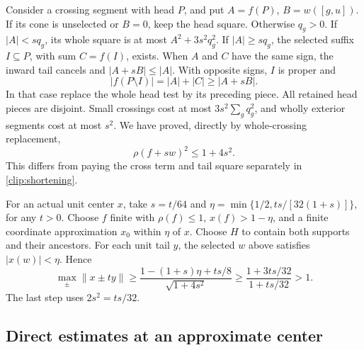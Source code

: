 Consider a crossing segment with head \(P\), and put
\(A=f(P)\), \(B=w([g,u])\). If its cone is unselected or \(B=0\),
keep the head square. Otherwise \(q_g>0\). If \(|A|<s q_g\), its whole
square is at most \(A^2+3s^2q_g^2\). If \(|A|\ge s q_g\), the selected
suffix \(I\subseteq P\), with sum \(C=f(I)\), exists. When \(A\) and
\(C\) have the same sign, the inward tail cancels and
\(|A+sB|\le|A|\). With opposite signs, \(I\) is proper and
\[
 |f(P\setminus I)|=|A|+|C|\ge|A+sB|.
\]
In that case replace the whole head test by its preceding piece.
All retained head pieces are disjoint. Small crossings cost at most
\(3s^2\sum_gq_g^2\), and wholly exterior segments cost at most \(s^2\).
We have proved, directly by whole-crossing replacement,
\begin{equation}\label{dir:primal:add:four-cost}
 \rho(f+sw)^2\le1+4s^2.
\end{equation}
This differs from paying the cross term and tail square separately in
\eqref{clip:shortening}.

For an actual unit center \(x\), take
\(s=t/64\) and \(\eta=\min\{1/2,ts/[32(1+s)]\}\), for any \(t>0\).
Choose \(f\) finite with \(\rho(f)\le1\), \(x(f)>1-\eta\), and a finite
coordinate approximation \(x_0\) within \(\eta\) of \(x\). Choose \(H\)
to contain both supports and their ancestors. For each unit tail \(y\),
the selected \(w\) above satisfies \(|x(w)|<\eta\). Hence
\begin{equation}\label{dir:primal:add:four-gain}
 \max_{\pm}\|x\pm ty\|
 \ge\frac{1-(1+s)\eta+ts/8}{\sqrt{1+4s^2}}
 \ge\frac{1+3ts/32}{1+ts/32}>1.
\end{equation}
The last step uses \(2s^2=ts/32\).

\subsection{Direct estimates at an approximate center}
\label{clip:approximate-center}

